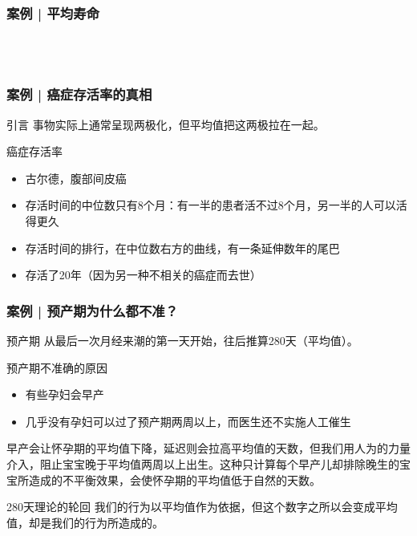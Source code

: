 \begin{frame}
  \frametitle{案例 | 平均寿命}
  \vspace{-1em}
  \begin{figure}
    \centering
    \quad
    \\
    \quad
    \\
  \end{figure}
\end{frame}

\begin{frame}
  \frametitle{案例 | 癌症存活率的真相}
  \begin{block}{引言}
    事物实际上通常呈现两极化，但平均值把这两极拉在一起。
  \end{block}
  \pause
  \begin{block}{癌症存活率}
    \begin{itemize}
      \item 古尔德，腹部间皮癌
      \item 存活时间的中位数只有8个月：有一半的患者活不过8个月，另一半的人可以活得更久
      \item 存活时间的排行，在中位数右方的曲线，有一条延伸数年的尾巴
      \item 存活了20年（因为另一种不相关的癌症而去世）
    \end{itemize}
  \end{block}
\end{frame}

\begin{frame}
  \frametitle{案例 | 预产期为什么都不准？}
  \begin{block}{预产期}
    从最后一次月经来潮的第一天开始，往后推算280天（平均值）。
  \end{block}
  \pause
  \pause
  \pause
  \begin{block}{预产期不准确的原因}
    \begin{itemize}
      \item 有些孕妇会早产
      \item 几乎没有孕妇可以过了预产期两周以上，而医生还不实施人工催生
    \end{itemize}
早产会让怀孕期的平均值下降，延迟则会拉高平均值的天数，但我们用人为的力量介入，阻止宝宝晚于平均值两周以上出生。这种只计算每个早产儿却排除晚生的宝宝所造成的不平衡效果，会使怀孕期的平均值低于自然的天数。
  \end{block}
  \pause
  \begin{block}{280天理论的轮回}
    我们的行为以平均值作为依据，但这个数字之所以会变成平均值，却是我们的行为所造成的。
  \end{block}
\end{frame}

